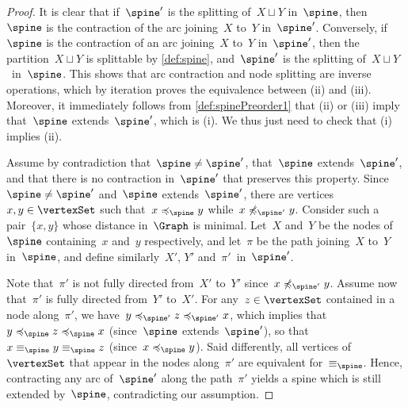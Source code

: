 \documentclass{amsart}
\theoremstyle{definition}
\begin{document}
\begin{proof}
  It is clear that if~$\spine'$ is the splitting of~$X \sqcup Y$ in~$\spine$, then~$\spine$ is the contraction of the arc joining~$X$ to~$Y$ in~$\spine'$.
  Conversely, if~$\spine$ is the contraction of an arc joining~$X$ to~$Y$ in~$\spine'$, then the partition~$X \sqcup Y$ is splittable by \cref{def:spine}, and~$\spine'$ is the splitting of~$X \sqcup Y$~in~$\spine$.
  This shows that arc contraction and node splitting are inverse operations, which by iteration proves the equivalence between (ii) and (iii).
  Moreover, it immediately follows from \cref{def:spinePreorder1} that (ii) or (iii) imply that~$\spine$ extends~$\spine'$, which is (i).
  We thus just need to check that (i) implies (ii).

  Assume by contradiction that~$\spine \ne \spine'$, that~$\spine$ extends~$\spine'$, and that there is no contraction in~$\spine'$ that preserves this property.
  Since~$\spine \ne \spine'$ and~$\spine$ extends~$\spine'$, there are vertices~$x, y \in \vertexSet$ such that~$x \preccurlyeq_{\spine} y$ while~$x \not\preccurlyeq_{\spine'} y$.
  Consider such a pair~$\{x,y\}$ whose distance in~$\Graph$ is minimal.
  Let~$X$ and~$Y$ be the nodes of~$\spine$ containing~$x$ and~$y$ respectively, and let~$\pi$ be the path joining~$X$ to~$Y$ in~$\spine$, and define similarly~$X'$, $Y'$ and~$\pi'$~in~$\spine'$.

  Note that~$\pi'$ is not fully directed from~$X'$ to~$Y'$ since~$x \not\preccurlyeq_{\spine'} y$.
  Assume now that~$\pi'$ is fully directed from~$Y'$ to~$X'$.
  For any~$z \in \vertexSet$ contained in a node along~$\pi'$, we have~$y \preccurlyeq_{\spine'} z \preccurlyeq_{\spine'} x$, which implies that~$y \preccurlyeq_{\spine} z \preccurlyeq_{\spine} x$ (since~$\spine$ extends~$\spine'$), so that~$x \equiv_{\spine} y \equiv_{\spine} z$ (since~$x \preccurlyeq_{\spine} y$).
  Said differently, all vertices of~$\vertexSet$ that appear in the nodes along~$\pi'$ are equivalent for~$\equiv_{\spine}$.
  Hence, contracting any arc of~$\spine'$ along the path~$\pi'$ yields a spine which is still extended by~$\spine$, contradicting our assumption.
  

\end{proof}
\end{document}

